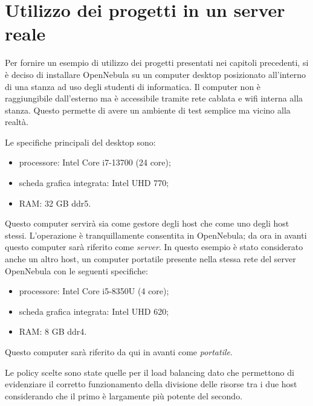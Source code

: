 
\chapter{Utilizzo dei progetti in un server reale}
\label{cap:capitolo4}
Per fornire un esempio di utilizzo dei progetti presentati nei capitoli precedenti, si è deciso di installare OpenNebula su un computer desktop posizionato all'interno di una stanza ad uso degli studenti di informatica. Il computer non è raggiungibile dall'esterno ma è accessibile tramite rete cablata e wifi interna alla stanza. Questo permette di avere un ambiente di test semplice ma vicino alla realtà.\par
Le specifiche principali del desktop sono:
\begin{itemize}
    \item processore: Intel Core i7-13700 (24 core);
    \item scheda grafica integrata: Intel UHD 770;
    \item RAM: 32 GB ddr5.
\end{itemize}
Questo computer servirà sia come gestore degli host che come uno degli host stessi. L'operazione è tranquillamente consentita in OpenNebula; da ora in avanti questo computer sarà riferito come \emph{server}.
In questo esempio è stato considerato anche un altro host, un computer portatile presente nella stessa rete del server OpenNebula con le seguenti specifiche:
\begin{itemize}
    \item processore: Intel Core i5-8350U (4 core);
    \item scheda grafica integrata: Intel UHD 620;
    \item RAM: 8 GB ddr4.
\end{itemize}
Questo computer sarà riferito da qui in avanti come \emph{portatile}.\par
Le policy scelte sono state quelle per il load balancing dato che permettono di evidenziare il corretto funzionamento della divisione delle risorse tra i due host considerando che il primo è largamente più potente del secondo.
